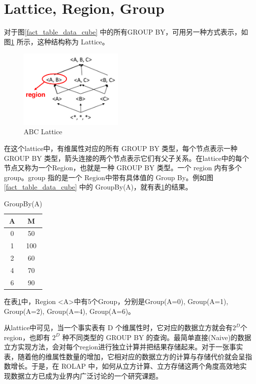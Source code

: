 \section{Lattice, Region, Group}

对于图\ref{fact_table_data_cube} 中的所有GROUP BY，可用另一种方式表示，如图\ref{abc_lattice} 所示，这种结构称为 Lattice。

\begin{figure}[hbtp]
\centering\includegraphics[width=2in]{picture/ch_preliminary/abc_lattice} 
\caption{ABC Lattice}\label{abc_lattice} 
\end{figure} 

在这个lattice中，有维属性对应的所有 GROUP BY 类型，每个节点表示一种 GROUP BY 类型，箭头连接的两个节点表示它们有父子关系。在lattice中的每个节点又称为一个Region，也就是一种 GROUP BY 类型。一个 region 内有多个 group。group 指的是一个
Region中带有具体值的 Group By。例如图\ref{fact_table_data_cube} 中的 GroupBy(A)，就有表\ref{groupby_a_table}的结果。

\begin{table}[hbtp]
\begin{center}
\begin{tabular}{|c|c|}
\hline 
A & M \\ 
\hline 
0 & 50 \\ 
\hline 
1 & 100 \\ 
\hline 
2 & 60 \\ 
\hline 
4 & 70 \\ 
\hline 
6 & 90 \\ 
\hline 
\end{tabular} 
\end{center}
\caption{GroupBy(A)}\label{groupby_a_table}
\end{table}

在表\ref{groupby_a_table}中，Region \textless A\textgreater 中有5个Group，分别是Group(A=0), Group(A=1), Group(A=2), Group(A=4), Group(A=6)。

从lattice中可见，当一个事实表有 D 个维属性时，它对应的数据立方就会有${2}^{D}$个region，也即有 ${2}^{D}$ 种不同类型的 GROUP BY 的查询。最简单直接(Naive)的数据立方实现方法，会对每个region进行独立计算并把结果存储起来。对于一张事实表，随着他的维属性数量的增加，它相对应的数据立方的计算与存储代价就会呈指数增长。于是，在 ROLAP 中，如何从立方计算、立方存储这两个角度高效地实现数据立方已成为业界内广泛讨论的一个研究课题。


